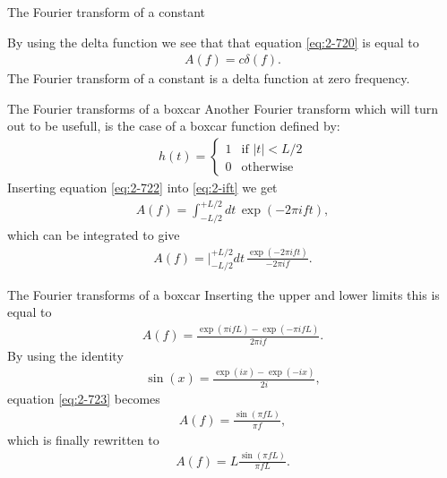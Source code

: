 \documentclass[xcolor=dvipsnames,notes]{beamer}
\begin{document}
\begin{frame}{The Fourier transform of a constant}

By using the delta function we see that that equation \eqref{eq:2-720} is equal to
%
\begin{eqnarray}
A(f) = c\delta(f).
  \label{eq:2-721}
\end{eqnarray}
%
The Fourier transform of a constant is a delta function at zero frequency. 
\end{frame}
\begin{frame}{The Fourier transforms of a boxcar}
Another Fourier transform which will turn out to be usefull, is the case of a boxcar function defined by:
%
\begin{eqnarray}
h(t)=\left\{ \begin{array}{ll}
                        1  & \mbox{if $|t| <  L/2$}  \\
                        0  & \mbox{otherwise}
             \end{array}
     \right.             
     \label{eq:2-722}
\end{eqnarray}
Inserting equation \eqref{eq:2-722} into \eqref{eq:2-ift} we get
%
\begin{eqnarray}
A(f) = \int^{+L/2}_{-L/2} dt\,  \exp(-2\pi i f t), 
\end{eqnarray}
%
which can be integrated to give
%
\begin{eqnarray}
A(f) = |^{+L/2}_{-L/2} dt\,  \frac{\exp(-2\pi i f t)}{-2\pi i f}. 
\end{eqnarray}
%
\end{frame}
\begin{frame}{The Fourier transforms of a boxcar}
Inserting the upper and lower limits this is equal to
%
\begin{eqnarray}
A(f) =  \frac{\exp(\pi i f L)-\exp(-\pi i f L)}{2\pi i f}. 
            \label{eq:2-723}
\end{eqnarray}
%
By using the identity
%
\begin{eqnarray}
 \sin(x)=\frac{\exp(ix)-\exp(-ix)}{2i},
\end{eqnarray}
equation \eqref{eq:2-723} becomes
%
\begin{eqnarray}
A(f) =  \frac{\sin(\pi f L)}{\pi f}, 
            \label{eq:2-725}
\end{eqnarray}
which is finally rewritten to
%
\begin{eqnarray}
A(f) =  L \frac{\sin(\pi f L)}{\pi f L}. 
            \label{eq:2-726}
\end{eqnarray}
%
\end{frame}
\end{document}
